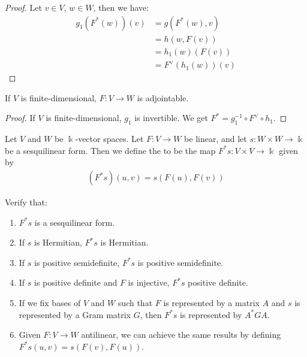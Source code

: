 \begin{proof}
	Let $v \in V$, $w \in W$, then we have:
	\begin{align*}
		g_1(F^*(w))(v) 
		&= g(F^*(w),v)\\
		&= h(w,F(v))\\
		&= h_1(w)(F(v))\\
		&= F^\vee(h_1(w))(v)
	\end{align*}
\end{proof}
\begin{corollary}
	If $V$ is finite-dimensional, $F : V \to W$ is adjointable.
\end{corollary}
\begin{proof}
	If $V$ is finite-dimensional, $g_1$ is invertible. We get $F^* = g_1^{-1} \circ F^\vee \circ h_1$.
\end{proof}
\begin{definition}
	Let $V$ and $W$ be $\Bbbk$-vector spaces. Let $F : V \to W$ be linear, and let $s : W \times W \to \Bbbk$ be a sesquilinear form. Then we define the  to be the map $F^*s : V \times V \to \Bbbk$ given by
	\begin{align*}
		(F^*s)(u,v) = s(F(u), F(v))
	\end{align*}
\end{definition}
\begin{exercise}
	Verify that:
	\begin{enumerate}
		\item $F^*s$ is a sesquilinear form.
		\item If $s$ is Hermitian, $F^*s$ is Hermitian.
		\item If $s$ is positive semidefinite, $F^*s$ is positive semidefinite.
		\item 
		If $s$ is positive definite and $F$ is injective, $F^*s$ positive definite.
		\item If we fix bases of $V$ and $W$ such that $F$ is represented by a matrix $A$ and $s$ is represented by a Gram matrix $G$, then $F^*s$ is represented by $A^*GA$.
		\item Given $F : V \to W$ antilinear, we can achieve the same results by defining $F^*s(u,v) = s(F(v),F(u))$.
	\end{enumerate}
\end{exercise}

